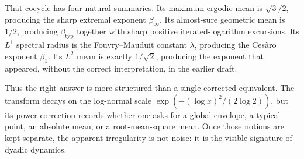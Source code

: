 \documentclass[11pt,oneside]{article}
\theoremstyle{definition}
\theoremstyle{remark}
\begin{document}
That cocycle has four natural summaries.  Its maximum ergodic mean is
$\sqrt3/2$, producing the sharp extremal exponent $\beta_\infty$.  Its almost-sure
geometric mean is $1/2$, producing $\beta_{\mathrm{typ}}$ together with sharp positive
iterated-logarithm excursions.  Its $L^1$ spectral radius is the Fouvry--Mauduit constant
$\lambda$, producing the Ces\`aro exponent $\beta_1$.  Its $L^2$ mean is exactly
$1/\sqrt2$, producing the exponent that appeared, without the correct interpretation,
in the earlier draft.

Thus the right answer is more structured than a single corrected equivalent.  The
transform decays on the log-normal scale
$\exp(- (\log x)^2/(2\log2))$, but its power correction records whether one asks for a
global envelope, a typical point, an absolute mean, or a root-mean-square mean.  Once
those notions are kept separate, the apparent irregularity is not noise: it is the
visible signature of dyadic dynamics.
\end{document}
